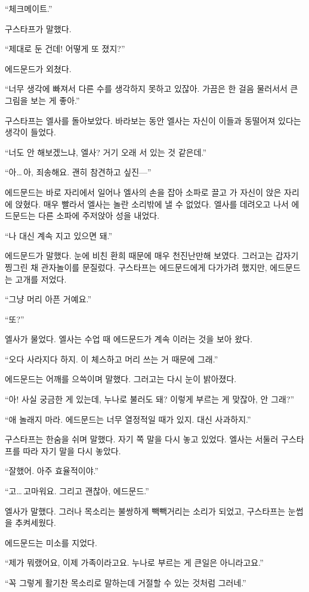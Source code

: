 ``체크메이트.''

구스타프가 말했다.

``제대로 둔 건데! 어떻게 또 졌지?''

에드문드가 외쳤다.

``너무 생각에 빠져서 다른 수를 생각하지 못하고 있잖아. 가끔은 한 걸음 물러서서 큰 그림을 보는 게 좋아.''

구스타프는 엘사를 돌아보았다. 바라보는 동안 엘사는 자신이 이들과 동떨어져 있다는 생각이 들었다.

``너도 안 해보겠느냐, 엘사? 거기 오래 서 있는 것 같은데.''

``아\ldots\,아, 죄송해요. 괜히 참견하고 싶진—''

에드문드는 바로 자리에서 일어나 엘사의 손을 잡아 소파로 끌고 가 자신이 앉은 자리에 앉혔다. 매우 빨라서 엘사는 놀란 소리밖에 낼 수 없었다. 엘사를 데려오고 나서 에드문드는 다른 소파에 주저앉아 성을 내었다.

``나 대신 계속 지고 있으면 돼.''

에드문드가 말했다. 눈에 비친 환희 때문에 매우 천진난만해 보였다. 그러고는 갑자기 찡그린 채 관자놀이를 문질렀다. 구스타프는 에드문드에게 다가가려 했지만, 에드문드는 고개를 저었다.

``그냥 머리 아픈 거예요.''

``또?''

엘사가 물었다. 엘사는 수업 때 에드문드가 계속 이러는 것을 보아 왔다.

``오다 사라지다 하지. 이 체스하고 머리 쓰는 거 때문에 그래.''

에드문드는 어깨를 으쓱이며 말했다. 그러고는 다시 눈이 밝아졌다.

``아! 사실 궁금한 게 있는데, 누나로 불러도 돼? 이렇게 부르는 게 맞잖아, 안 그래?''

``애 놀래지 마라. 에드문드는 너무 열정적일 때가 있지. 대신 사과하지.''

구스타프는 한숨을 쉬며 말했다. 자기 쪽 말을 다시 놓고 있었다. 엘사는 서둘러 구스타프를 따라 자기 말을 다시 놓았다.

``잘했어. 아주 효율적이야.''

``고\ldots\,고마워요. 그리고 괜찮아, 에드문드.''

엘사가 말했다. 그러나 목소리는 불쌍하게 빽빽거리는 소리가 되었고, 구스타프는 눈썹을 추켜세웠다.

에드문드는 미소를 지었다.

``제가 뭐랬어요, 이제 가족이라고요. 누나로 부르는 게 큰일은 아니라고요.''

``꼭 그렇게 활기찬 목소리로 말하는데 거절할 수 있는 것처럼 그러네.''

